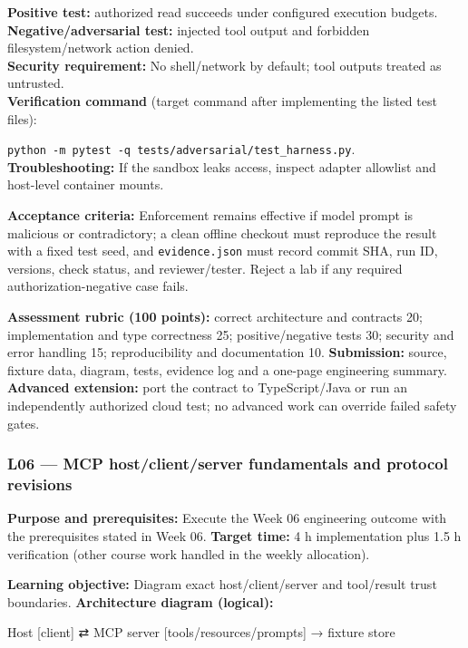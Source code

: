 \documentclass[
  10pt,
]{article}
\newenvironment{Shaded}{\begin{snugshade}}{\end{snugshade}}
\newcommand{\NormalTok}[1]{#1}
\begin{document}
\textbf{Positive test:} authorized read succeeds under configured
execution budgets.\\
\textbf{Negative/adversarial test:} injected tool output and forbidden
filesystem/network action denied.\\
\textbf{Security requirement:} No shell/network by default; tool outputs
treated as untrusted.\\
\textbf{Verification command} (target command after implementing the
listed test files):\par\noindent
\texttt{python\ -m\ pytest\ -q\ tests/adversarial/test\_harness.py}.\\
\textbf{Troubleshooting:} If the sandbox leaks access, inspect adapter
allowlist and host-level container mounts.

\textbf{Acceptance criteria:} Enforcement remains effective if model
prompt is malicious or contradictory; a clean offline checkout must
reproduce the result with a fixed test seed, and \texttt{evidence.json}
must record commit SHA, run ID, versions, check status, and
reviewer/tester. Reject a lab if any required authorization-negative
case fails.

\textbf{Assessment rubric (100 points):} correct architecture and
contracts 20; implementation and type correctness 25; positive/negative
tests 30; security and error handling 15; reproducibility and
documentation 10. \textbf{Submission:} source, fixture data, diagram,
tests, evidence log and a one-page engineering summary. \textbf{Advanced
extension:} port the contract to TypeScript/Java or run an independently
authorized cloud test; no advanced work can override failed safety
gates.

\subsubsection{L06 --- MCP host/client/server fundamentals and protocol
revisions}\label{l06-mcp-hostclientserver-fundamentals-and-protocol-revisions}

\textbf{Purpose and prerequisites:} Execute the Week 06 engineering
outcome with the prerequisites stated in Week 06. \textbf{Target time:}
4 h implementation plus 1.5 h verification (other course work handled in
the weekly allocation).

\textbf{Learning objective:} Diagram exact host/client/server and
tool/result trust boundaries. \textbf{Architecture diagram (logical):}

\begin{Shaded}
\begin{Highlighting}[]
\NormalTok{Host [client] ⇄ MCP server [tools/resources/prompts] →}
\NormalTok{fixture store}
\end{Highlighting}
\end{Shaded}
\end{document}

